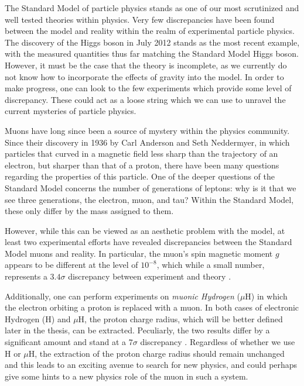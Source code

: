 \label{chapter:introduction}

The Standard Model of particle physics stands as one of our most scrutinized and well tested theories within physics.
Very few discrepancies have been found between the model and reality within the realm of experimental particle physics.
The discovery of the Higgs boson in July 2012 stands as the most recent example, with the measured quantities thus far matching the Standard Model Higgs boson.
However, it must be the case that the theory is incomplete, as we currently do not know how to incorporate the effects of gravity into the model.
In order to make progress, one can look to the few experiments which provide some level of discrepancy.
These could act as a loose string which we can use to unravel the current mysteries of particle physics.

Muons have long since been a source of mystery within the physics community.
Since their discovery in 1936 by Carl Anderson and Seth Neddermyer, in which particles that curved in a magnetic field less sharp than the trajectory of an electron, but sharper than that of a proton, there have been many questions regarding the properties of this particle.
One of the deeper questions of the Standard Model concerns the number of generations of leptons: why is it that we see three generations, the electron, muon, and tau? Within the Standard Model, these only differ by the mass assigned to them.

However, while this can be viewed as an aesthetic problem with the model, at least two experimental efforts have revealed discrepancies between the Standard Model muons and reality.
In particular, the muon's spin magnetic moment $g$ appears to be different at the level of $10^{-8}$, which while a small number, represents a $3.4\sigma$ discrepancy between experiment and theory \cite{2007PhLB..649..173H}.

Additionally, one can perform experiments on \emph{muonic Hydrogen} ($\mu\textrm{H}$) in which the electron orbiting a proton is replaced with a muon.
In both cases of electronic Hydrogen (H) and $\mu\textrm{H}$, the proton charge radius, which will be better defined later in the thesis, can be extracted.
Peculiarly, the two results differ by a significant amount  and stand at a $7\sigma$ discrepancy \cite{Carlson:2015jba}.
Regardless of whether we use H or $\mu\textrm{H}$, the extraction of the proton charge radius should remain unchanged and this leads to an exciting avenue to search for new physics, and could perhaps give some hints to a new physics role of the muon in such a system.

